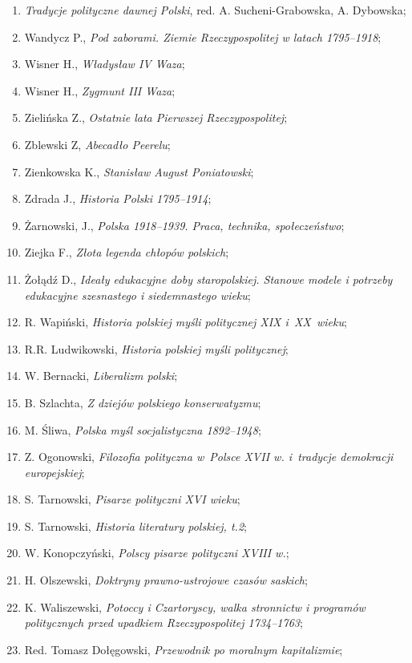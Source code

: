 \documentclass[a4paper,11pt]{article}
\begin{document}
\begin{enumerate}
{    bezpieczeństwa 1944--1990};
\item \emph{Tradycje polityczne dawnej Polski}, red. A.
  Sucheni-Grabowska, A. Dybowska;
\item Wandycz P., \emph{Pod zaborami. Ziemie Rzeczypospolitej w latach
    1795--1918};
\item Wisner H., \emph{Władysław IV Waza};
\item Wisner H., \emph{Zygmunt III Waza};
\item Zielińska Z., \emph{Ostatnie lata Pierwszej Rzeczypospolitej};
\item Zblewski Z, \emph{Abecadło Peerelu};
\item Zienkowska K., \emph{Stanisław August Poniatowski};
\item Zdrada J., \emph{Historia Polski 1795--1914};
\item Żarnowski, J., \emph{Polska 1918--1939. Praca, technika,
    społeczeństwo};
\item Ziejka F., \emph{Złota legenda chłopów polskich};
\item Żołądź D., \emph{Ideały edukacyjne doby staropolskiej. Stanowe
    modele i potrzeby edukacyjne szesnastego i siedemnastego wieku};
\item R. Wapiński, \emph{Historia polskiej myśli politycznej XIX
    i~XX~wieku};
\item R.R. Ludwikowski, \emph{Historia polskiej myśli politycznej};
\item W. Bernacki, \emph{Liberalizm polski};
\item B. Szlachta, \emph{Z dziejów polskiego konserwatyzmu};
\item M. Śliwa, \emph{Polska myśl socjalistyczna 1892--1948};
\item Z. Ogonowski, \emph{Filozofia polityczna w~Polsce XVII w.
    i~tradycje demokracji europejskiej};
\item S. Tarnowski, \emph{Pisarze polityczni XVI wieku};
\item S. Tarnowski, \emph{Historia literatury polskiej, t.2};
\item W. Konopczyński, \emph{Polscy pisarze polityczni XVIII w.};
\item H. Olszewski, \emph{Doktryny prawno-ustrojowe czasów saskich};
\item K. Waliszewski, \emph{Potoccy i Czartoryscy, walka stronnictw i
    programów politycznych przed upadkiem Rzeczypospolitej
    1734--1763};
\item Red. Tomasz Dołęgowski, \emph{Przewodnik po moralnym
    kapitalizmie};

\end{enumerate}
\end{document}

